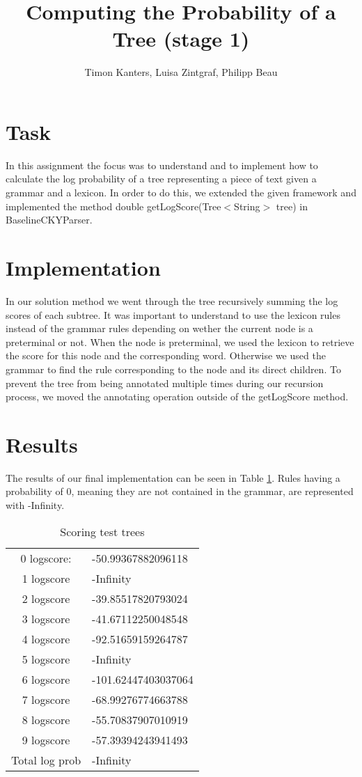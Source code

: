 \documentclass{article}
\begin{document}
\title{Computing the Probability of a Tree (stage 1)}
\author{Timon Kanters, Luisa Zintgraf, Philipp Beau}
\maketitle

\section{Task}

In this assignment the focus was to understand and to implement how to calculate the log probability of a tree representing a piece of text given a grammar and a lexicon. In order to do this, we extended the given framework and implemented the method double getLogScore(Tree$<$String$>$ tree) in BaselineCKYParser.

\section{Implementation}

In our solution method we went through the tree recursively summing the log scores of each subtree. It was important to understand to use the lexicon rules instead of the grammar rules depending on wether the current node is a preterminal or not.
When the node is preterminal, we used the lexicon to retrieve the score for this node and the corresponding word. Otherwise we used the grammar to find the rule corresponding to the node and its direct children.
To prevent the tree from being annotated multiple times during our recursion process, we moved the annotating operation outside of the getLogScore method.

\section{Results}

The results of our final implementation can be seen in Table \ref{tab:scores}. Rules having a probability of 0, meaning they are not contained in the grammar, are represented with -Infinity.

\vspace{1cm}
\begin {table}[h]
\centering
\begin{tabular}{c l}
0 logscore: & -50.99367882096118 \\
1 logscore &  -Infinity  \\
2 logscore &  -39.85517820793024  \\
3 logscore &  -41.67112250048548  \\
4 logscore &  -92.51659159264787  \\
5 logscore &  -Infinity  \\
6 logscore &  -101.62447403037064  \\
7 logscore &  -68.99276774663788  \\
8 logscore &  -55.70837907010919  \\
9 logscore &  -57.39394243941493  \\
Total log prob & -Infinity \\
\end{tabular}
\caption{Scoring test trees}
\label{tab:scores}
\end {table}
\end{document}
